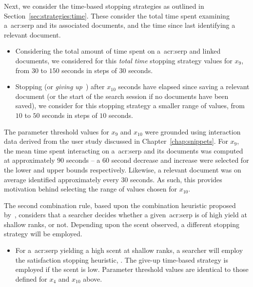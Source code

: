 Next, we consider the time-based stopping strategies as outlined in Section~\ref{sec:strategies:time}. These consider the total time spent examining a~\gls{acr:serp} and its associated documents, and the time since last identifying a relevant document.

\begin{itemize}
    \item{ Considering the total amount of time spent on a~\gls{acr:serp} and linked documents, we considered for this \emph{total time} stopping strategy values for $x_9$, from $30$ to $150$ seconds in steps of $30$ seconds.}
    
    \item{ Stopping (or \emph{giving up}~\citep{krebs1974leave_after_rule}) after $x_{10}$ seconds have elapsed since saving a relevant document (or the start of the search session if no documents have been saved), we consider for this stopping strategy a smaller range of values, from $10$ to $50$ seconds in steps of $10$ seconds.}
\end{itemize}

The parameter threshold values for $x_9$ and $x_{10}$ were grounded using interaction data derived from the user study discussed in Chapter~\ref{chap:snippets}. For $x_9$, the mean time spent interacting on a~\gls{acr:serp} and its documents was computed at approximately $90$ seconds -- a $60$ second decrease and increase were selected for the lower and upper bounds respectively. Likewise, a relevant document was on average identified approximately every $30$ seconds. As such, this provides motivation behind selecting the range of values chosen for $x_{10}$.

The second combination rule, based upon the combination heuristic proposed by~\cite{mcnair1982gut_mvt}, considers that a searcher decides whether a given~\gls{acr:serp} is of high yield at shallow ranks, or not. Depending upon the scent observed, a different stopping strategy will be employed.

\begin{itemize}
    \item{ For a~\gls{acr:serp} yielding a high scent at shallow ranks, a searcher will employ the satisfaction stopping heuristic, . The give-up time-based strategy  is employed if the scent is low. Parameter threshold values are identical to those defined for $x_4$ and $x_{10}$ above.}
\end{itemize}

